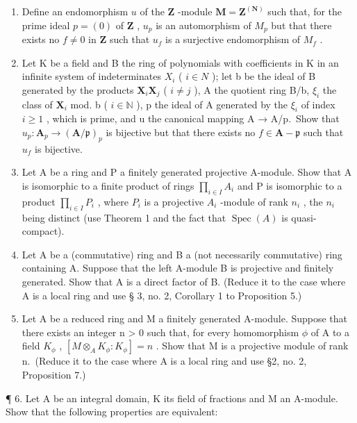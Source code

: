 
\begin{enumerate}
\def\labelenumi{\arabic{enumi}.}
\item
  Define an endomorphism \(u\) of the \(\mathbf{Z}\) -module \(\mathbf{M} = \mathbf{Z}^{(\mathbf{N})}\) such that, for the prime ideal \(p = (0)\) of \(\mathbf{Z}\) , \(u_{p}\) is an automorphism of \(M_p\) but that there exists no \(f \neq 0\) in \(\mathbf{Z}\) such that \(u_f\) is a surjective endomorphism of \(M_f\) .
\item
  Let K be a field and B the ring of polynomials with coefficients in K in an infinite system of indeterminates \(X_{i}\) ( \(i \in N\) ); let b be the ideal of B generated by the products \(\mathbf{X}_i\mathbf{X}_j\) ( \(i \neq j\) ), A the quotient ring B/b, \(\xi_i\) the class of \(\mathbf{X}_i\) mod. b ( \(i \in \mathbb{N}\) ), p the ideal of A generated by the \(\xi_i\) of index \(i \geqslant 1\) , which is prime, and u the canonical mapping A → A/p.~Show that \(u_p: \mathbf{A}_p \to (\mathbf{A}/\mathfrak{p})_p\) is bijective but that there exists no \(f \in \mathbf{A} - \mathfrak{p}\) such that \(u_f\) is bijective.
\item
  Let A be a ring and P a finitely generated projective A-module. Show that A is isomorphic to a finite product of rings \(\prod_{i\in I}A_{i}\) and P is isomorphic to a product \(\prod_{i\in I}P_{i}\) , where \(P_{i}\) is a projective \(A_{i}\) -module of rank \(n_{i}\) , the \(n_{i}\) being distinct (use Theorem 1 and the fact that \(\operatorname{Spec}(A)\) is quasi-compact).
\item
  Let A be a (commutative) ring and B a (not necessarily commutative) ring containing A. Suppose that the left A-module B is projective and finitely generated. Show that A is a direct factor of B. (Reduce it to the case where A is a local ring and use § 3, no. 2, Corollary 1 to Proposition 5.)
\item
  Let A be a reduced ring and M a finitely generated A-module. Suppose that there exists an integer n \textgreater{} 0 such that, for every homomorphism \(\phi\) of A to a field \(K_{\phi}\) , \([M \otimes_{A} K_{\phi}: K_{\phi}] = n\) . Show that M is a projective module of rank n.~(Reduce it to the case where A is a local ring and use §2, no. 2, Proposition 7.)
\end{enumerate}

¶ 6. Let A be an integral domain, K its field of fractions and M an A-module. Show that the following properties are equivalent:

